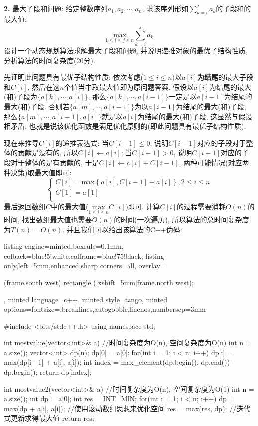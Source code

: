 \documentclass{article}
\begin{document}
\textbf{2.} 最大子段和问题: 给定整数序列$a_1, a_2, \cdots, a_n$, 求该序列形如$\displaystyle \sum_{k=i}^j a_k$的子段和的最大值: $$\displaystyle \underset{1\le i\le j\le n}{\text{max}} \sum_{k=i}^j a_k$$ 设计一个动态规划算法求解最大子段和问题, 并说明递推对象的最优子结构性质, 分析算法的时间复杂度(20分).

\solution 先证明此问题具有最优子结构性质: 依次考虑($1\leq i\leq n$)以$a[i]$\textbf{为结尾}的最大子段和$C[i]$, 然后在这$n$个值当中取最大值即为原问题答案. 假设以$a[i]$为结尾的最大(和)子段为$\{a[k],\cdots,a[i]\}$, 那么$\{a[k],\cdots,a[i-1]\}$一定是以$a[i-1]$为结尾的最大(和)子段. 否则若$\{a[m],\cdots,a[i-1]\}$为以$a[i-1]$为结尾的最大(和)子段, 那么$\{a[m],\cdots,a[i-1],a[i]\}$就是以$a[i]$为结尾的最大(和)子段, 这显然与假设相矛盾, 也就是说该优化函数是满足优化原则的(即此问题具有最优子结构性质). 

现在来推导$C[i]$的递推表达式: 当$C[i-1]\leq 0$, 说明$C[i-1]$对应的子段对于整体的贡献是没有的, 所以$C[i]\gets a[i]$; 当$C[i-1]>0$, 说明$C[i-1]$对应的子段对于整体的是有贡献的, 于是$C[i]\gets a[i]+C[i-1]$. 两种可能情况(对应两种决策)取最大值即可:$$\begin{cases}
    C\left[ i \right] =\text{max} \left\{ a\left[ i \right] ,C\left[ i-1 \right] +a\left[ i \right] \right\} , 2\le i\le n\\
    C\left[ 1 \right] =a\left[ 1 \right]\\
\end{cases}
$$
最后返回数组$C$中的最大值($\displaystyle \underset{1\le i\le n}{\text{max}}C\left[ i \right] $)即可. 计算$C[i]$的过程需要消耗$O(n)$的时间, 找出数组最大值也需要$O(n)$的时间(一次遍历), 所以算法的总时间复杂度为$T(n)=O(n)$. 并且我们可以给出该算法的C++伪码:
\begin{tcblisting}{listing engine=minted,boxrule=0.1mm,
    colback=blue!5!white,colframe=blue!75!black,
    listing only,left=5mm,enhanced,sharp corners=all,
    overlay={\begin{tcbclipinterior} (frame.south west)
    rectangle ([xshift=5mm]frame.north west);\end{tcbclipinterior}},
    minted language=c++,
    minted style=tango,
    minted options={fontsize=\small,breaklines,autogobble,linenos,numbersep=3mm}}
    #include <bits/stdc++.h>
    using namespace std;
    
    int mostvalue(vector<int>& a) { //时间复杂度为O(n), 空间复杂度为O(n)
        int n = a.size();
        vector<int> dp(n);
        dp[0] = a[0];
        for(int i = 1; i < n; i++) {
            dp[i] = max(dp[i - 1] + a[i], a[i]);
        }
        int index = max_element(dp.begin(), dp.end()) - dp.begin();
        return dp[index];
    }
    
    int mostvalue2(vector<int>& a) {  //时间复杂度为O(n), 空间复杂度为O(1)
        int n = a.size();
        int dp = a[0];
        int res = INT_MIN;
        for(int i = 1; i < n; i++) {
            dp = max(dp + a[i], a[i]);  //使用滚动数组思想来优化空间
            res = max(res, dp); //迭代式更新求得最大值
        }
        return res;
    }
\end{tcblisting}
\end{document}
